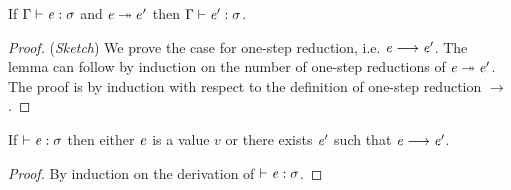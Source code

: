 \begin{lem}\label{lem:ecore:reduct}
If $\Gamma  \vdash  \mathit{e}  :  \sigma$ and $\mathit{e}  \twoheadrightarrow  e'$ then $\Gamma  \vdash  \mathit{e'}  :  \sigma$.
\end{lem}

\begin{proof}
    (\emph{Sketch}) We prove the case for one-step reduction, i.e. $\mathit{e}  \longrightarrow  \mathit{e'}$. The lemma can follow by induction on the number of one-step reductions of $\mathit{e}  \twoheadrightarrow  \mathit{e'}$.
    The proof is by induction with respect to the definition of one-step reduction $ \longrightarrow $.
\end{proof}

\begin{lem}[Progress]\label{lem:ecore:prog}
If $\vdash  \mathit{e}  :  \sigma$ then either $\mathit{e}$ is a value $v$ or there exists $\mathit{e}'$ such that $\mathit{e}  \longrightarrow  \mathit{e'}$.
\end{lem}

\begin{proof}
    By induction on the derivation of $\vdash  \mathit{e}  :  \sigma$.
\end{proof}
